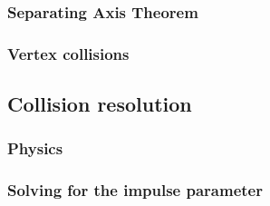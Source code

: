 \subsubsection{Separating Axis Theorem}
\subsubsection{Vertex collisions}

\subsection{Collision resolution}
\label{sub:resolution}
\cite{collision:resolution}
\subsubsection{Physics}
\subsubsection{Solving for the impulse parameter}
